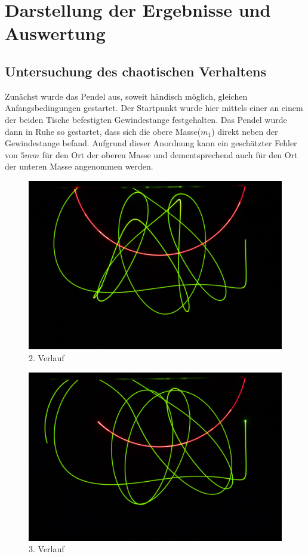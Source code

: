 \section{Darstellung der Ergebnisse und Auswertung}

\subsection{Untersuchung des chaotischen Verhaltens}
Zunächst wurde das Pendel aus, soweit händisch möglich, gleichen Anfangsbedingungen gestartet. Der Startpunkt wurde hier mittels einer an einem der beiden Tische befestigten Gewindestange festgehalten. Das Pendel wurde dann in Ruhe so gestartet, dass sich die obere Masse($ m_{1} $) direkt neben der Gewindestange befand. Aufgrund dieser Anordnung kann ein geschätzter Fehler von $ 5  mm $ für den Ort der oberen Masse und dementsprechend auch für den Ort der unteren Masse angenommen werden.

\begin{figure}
        \includegraphics[width=.9\textwidth]{images/pendel-10.jpg}
\caption{2. Verlauf}
\label{pendel-10}
\end{figure}

\begin{figure}
        \includegraphics[width=.9\textwidth]{images/pendel-9}
\caption{3. Verlauf}
\label{pendel-9}
\end{figure}

